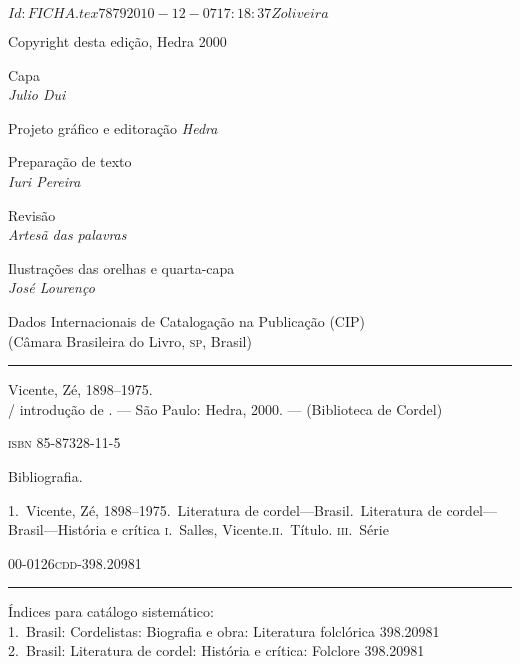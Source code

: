 \SVN $Id: FICHA.tex 7879 2010-12-07 17:18:37Z oliveira $

\pagebreak

\begingroup \fontsize{9pt}{0.7\baselineskip}\selectfont \parskip=0pt\thispagestyle{empty} 

\begin{center}
Copyright\raisebox{-1.2mm}{$^\copyright$}  desta edição, Hedra 2000\\\medskip

Capa\\
\textit{Julio Dui}\\\medskip

Projeto gráfico e editoração
\textit{Hedra}

Preparação de texto\\
\textit{Iuri Pereira}\\\medskip

Revisão\\
\textit{Artesã das palavras}\\\medskip

Ilustrações das orelhas e quarta-capa\\
\textit{José Lourenço}\\\bigskip

\begin{minipage}{.8\textwidth}
\fontsize{7pt}{5pt}\selectfont
Dados Internacionais de Catalogação na Publicação (CIP)\\
(Câmara Brasileira do Livro, \textsc{sp}, Brasil)\\
\mbox{}\vspace{-0.2ex}\hrule\vspace{1ex}

Vicente, Zé, 1898--1975.\\
\makeatletter\@autor / introdução de \@introdutor\makeatother.
--- São Paulo: Hedra, 2000. --- (Biblioteca de Cordel)\\\smallskip

\textsc{isbn} 85-87328-11-5\\\smallskip

Bibliografia.

1.~Vicente, Zé, 1898--1975.~Literatura de
cordel---Brasil.~Literatura de
cordel---Brasil---História e crítica\quad 
\textsc{i}.~Salles, Vicente.\quad \textsc{ii}.~Título.\quad
\textsc{iii}.~Série\\\medskip

00-0126\hfill \textsc{cdd}-398.20981

\vspace{1ex}\hrule\vspace{1ex}
Índices para catálogo sistemático:\\
1.~Brasil: Cordelistas: Biografia e obra: Literatura folclórica 398.20981\\
2.~Brasil: Literatura de cordel: História e crítica: Folclore 398.20981
\end{minipage}
\vfill


\end{center}
